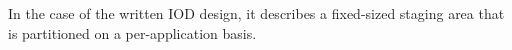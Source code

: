\documentclass[conference]{IEEEtran}
\begin{document}
%
In the case of the written IOD design, it describes a fixed-sized staging area
that is partitioned on a per-application basis.
%
%
\end{document}

